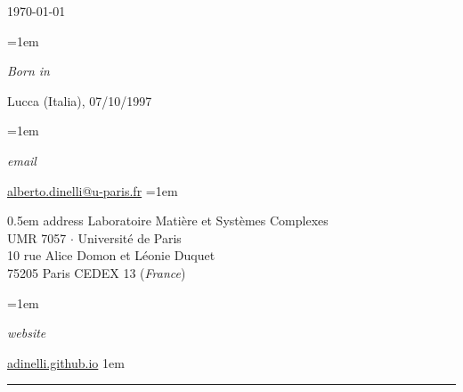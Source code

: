 \documentclass{scrartcl}
\newlength{\datebox}\settowidth{\datebox}{Sep 2019 - Feb 2020} %
\newcommand{\NewEntry}[3]{\noindent\hangindent=1em\hangafter=0 \parbox{\datebox}{\small \textit{#1}}\hspace{1.5em} #2 #3
  \vspace{0.5em}
}
\newcommand{\rdate}[1]{\textsc{#1}}
\begin{document}
\hfill \rdate{\today}

\begin{cv}{}
  \small
  
\vspace{2.0em} %


\NewEntry{Born in}{Lucca (Italia),}{07/10/1997} %

\NewEntry{email}{\href{mailto:alberto.dinelli@u-paris.fr}{alberto.dinelli@u-paris.fr}} %

\NewEntry{address}{Laboratoire Matière et Systèmes Complexes \\\-\hspace{4.0cm}UMR 7057 $\cdotp$ Université de Paris\\
  \-\hspace{4.0cm}10 rue Alice Domon et Léonie Duquet\\
  \-\hspace{4.0cm}75205 Paris CEDEX 13 (\textit{France})}

\NewEntry{website}{\href{https://adinelli.github.io/}{adinelli.github.io}}

\vspace{1em}

\par\noindent\rule{\textwidth}{0.4pt}

\vspace{1.5em}












\noindent{}\vspace{1em}
\small

\begin{tabular}{p{4cm}|p{14cm}} %
  

\end{tabular}
\end{cv}
\end{document}
